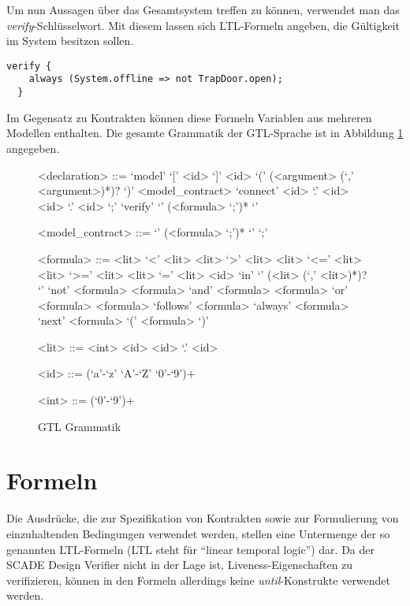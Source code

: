 Um nun Aussagen über das Gesamtsystem treffen zu können, verwendet man das \emph{verify}-Schlüsselwort.
Mit diesem lassen sich LTL-Formeln angeben, die Gültigkeit im System besitzen sollen.
\begin{lstlisting}[language=gtl]
  verify {
    always (System.offline => not TrapDoor.open);
  }
\end{lstlisting}
Im Gegensatz zu Kontrakten können diese Formeln Variablen aus mehreren Modellen enthalten.
Die gesamte Grammatik der GTL-Sprache ist in Abbildung \ref{fig:grammar} angegeben.

\begin{figure}
  \centering
  \begin{grammar}
    <declaration> ::= `model' `[' <id> `]' <id> `(' (<argument> (`,' <argument>)*)? `)' <model\_contract>
    \alt `connect' <id> `.' <id> <id> `.' <id> `;'
    \alt `verify' `{' (<formula> `;')* `}'
    
    <model\_contract> ::= `{' (<formula> `;')* `}'
    \alt `;'
    
    <formula> ::= <lit> `<' <lit>
    \alt <lit> `>' <lit>
    \alt <lit> `<=' <lit>
    \alt <lit> `>=' <lit>
    \alt <lit> `=' <lit>
    \alt <id> `in' `{' (<lit> (`,' <lit>)*)? `}'
    \alt `not' <formula>
    \alt <formula> `and' <formula>
    \alt <formula> `or' <formula>
    \alt <formula> `follows' <formula>
    \alt `always' <formula>
    \alt `next' <formula>
    \alt `(' <formula> `)'
    
    <lit> ::= <int>
    \alt <id>
    \alt <id> `.' <id>
    
    <id> ::= (`a'-`z' `A'-`Z' `0'-`9')+
    
    <int> ::= (`0'-`9')+
  \end{grammar}
  \caption{GTL Grammatik}
  \label{fig:grammar}
\end{figure}

\section{Formeln}
Die Ausdrücke, die zur Spezifikation von Kontrakten sowie zur Formulierung von einzuhaltenden Bedingungen verwendet werden, stellen eine Untermenge der so genannten LTL-Formeln (LTL steht für "`linear temporal logic"') dar.
Da der SCADE Design Verifier nicht in der Lage ist, Liveness-Eigenschaften zu verifizieren, können in den Formeln allerdings keine \emph{until}-Konstrukte verwendet werden.


